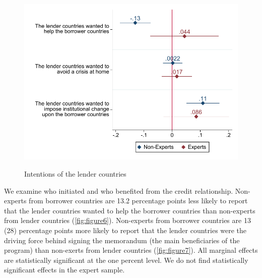  \begin{figure}[H]
\begin{center}
     \caption{Intentions of the lender countries}
    
     \includegraphics[scale=0.8]{Question2_base.pdf}
     \label{fig:figure6}
      \end{center}
      \tiny
\end{figure}
We examine who initiated and who benefited from the credit relationship. 
Non-experts from borrower countries are 13.2 percentage points less likely to report that the lender countries wanted to help the borrower countries than non-experts from lender countries (\autoref{fig:figure6}). Non-experts from borrower countries are 13 (28) percentage points more likely to report that the lender countries were the driving force behind signing the memorandum (the main beneficiaries of the program) than non-exerts from lender countries (\autoref{fig:figure7}). All marginal effects are statistically significant at the one percent level. We do not find statistically significant effects in the expert sample. \\
